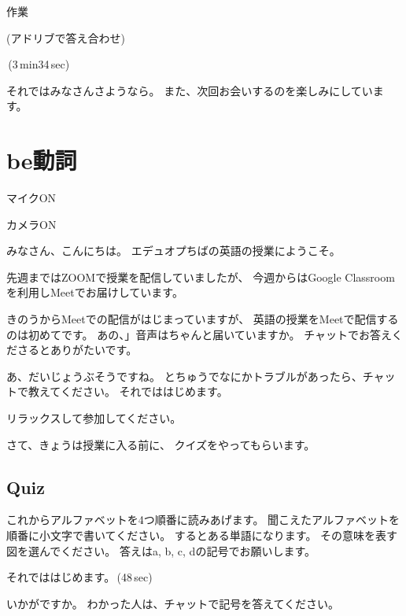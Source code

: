 \documentclass[12pt]{jlreq}
\newenvironment{my_check}
  {\begin{itemize}
    \renewcommand\labelitemi{$\square\hspace{0.5em}$}} %
  {\end{itemize}}
\begin{document}
\hrulefill{}

\hfill{}作業\hfill{}

\hrulefill

(アドリブで答え合わせ)

\faVolumeUp\,(3\,min34\,sec)

{\large \ComputerMouse}


それではみなさんさようなら。
また、次回お会いするのを楽しみにしています。

\newpage

\section{be動詞}

\begin{my_check}
\item マイクON
\item カメラON
\end{my_check}

{\LARGE \ComputerMouse}

みなさん、こんにちは。
エデュオプちばの英語の授業にようこそ。

先週まではZOOMで授業を配信していましたが、
今週からはGoogle Classroomを利用しMeetでお届けしています。

きのうからMeetでの配信がはじまっていますが、
英語の授業をMeetで配信するのは初めてです。
あの、」音声はちゃんと届いていますか。
チャットでお答えくださるとありがたいです。

あ、だいじょうぶそうですね。
とちゅうでなにかトラブルがあったら、チャットで教えてください。
それでははじめます。

リラックスして参加してください。


さて、きょうは授業に入る前に、
クイズをやってもらいます。

{\large \ComputerMouse}


\newpage
\subsection{Quiz}

これからアルファベットを4つ順番に読みあげます。
聞こえたアルファベットを順番に小文字で書いてください。
するとある単語になります。
その意味を表す図を選んでください。
答えはa, b, c, dの記号でお願いします。


それでははじめます。\faVolumeUp\,(48\,sec)

いかがですか。
わかった人は、チャットで記号を答えてください。
\end{document}
